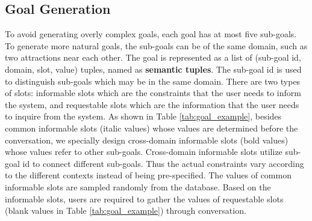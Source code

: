 \begin{table}[t]
    \centering
    \caption{A user goal example (translated into English). Slots with bold/italic/blank value are cross-domain informable slots, common informable slots, and requestable slots. In this example, the user wants to find an attraction and one of its nearby hotels, then book a taxi to commute between these two places.} 
    \label{tab:goal_example}
\end{table}

\subsection{Goal Generation}
\label{goal_generation}
To avoid generating overly complex goals, each goal has at most five sub-goals. To generate more natural goals, the sub-goals can be of the same domain, such as two attractions near each other. The goal is represented as a list of (sub-goal id, domain, slot, value) tuples, named as \textbf{semantic tuples}. The sub-goal id is used to distinguish sub-goals which may be in the same domain. 
There are two types of slots: informable slots which are the constraints that the user needs to inform the system, and requestable slots which are the information that the user needs to inquire from the system.
As shown in Table \ref{tab:goal_example}, besides common informable slots (italic values) whose values are determined before the conversation, we specially design cross-domain informable slots (bold values) whose values refer to other sub-goals. 
Cross-domain informable slots utilize sub-goal id to connect different sub-goals. Thus the actual constraints vary according to the different contexts instead of being pre-specified. The values of common informable slots are sampled randomly from the database. Based on the informable slots, users are required to gather the values of requestable slots (blank values in Table \ref{tab:goal_example}) through conversation.

